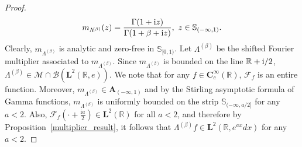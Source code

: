 \documentclass[12pt]{amsart}
\newcommand{\hptg}[2]{\hypertarget{#1}{#2}}
\numberwithin{equation}{section}
\newcommand{\bb}{\mathbb}
\newcommand{\hpt}[2]{#2}
\newcommand{\bmrm}[2][2]{\mathbf{#2}^{#1}}
\newcommand{\fou}{\mathcal{F}}
\newcommand{\C}{\mathbf{C}}
\newcommand{\A}{\mathbf{A}}
\newcommand{\LL}{\Lambda}
\renewcommand{\i}{\mathrm{i}}
\theoremstyle{definition}
\theoremstyle{assump}
\theoremstyle{remark}
\begin{document}
{\begin{proof}
\begin{align*}
m_{\Lambda^{\!(\beta)}}(z)=\frac{\Gamma(1+{\rm{i}}z   )}{\Gamma(1+\beta+{\rm{i}}z)}, \ z\in\bb{S}_{(-\infty,1)}.
\end{align*}
Clearly, $m_{\Lambda^{\!(\beta)}}$ is analytic and zero-free in $\bb{S}_{[0,1)}$. Let  $\Lambda^{\!(\beta)}$ be the shifted Fourier multiplier associated to $m_{\Lambda^{\!(\beta)}}$. Since $m_{\Lambda^{\!(\beta)}}$ is bounded on the line $\bb{R}+{\rm{i}}/2$, $\Lambda^{\!(\beta)}\in\mathscr{M}\cap\mathscr{B}(\bmrm{L}(\bb{R},e))$.  We note that for any $f\in \C^\infty_c(\bb{R})$, $\mathcal{F}_{f}$ is an entire function. Moreover, $m_{\LL^{\!(\beta)}}\in\A_{(-\infty,1)}$ and by the Stirling asymptotic formula of Gamma functions, $m_{\LL^{\!(\beta)}}$ is uniformly bounded on the \hpt{R24}{strip $\bb{S}_{(-\infty, a/2]}$ for any $a<2$}. \hptg{C39}{Also, $\fou_f(\cdot+\frac{\i a}{2})\in\bmrm{L}(\bb R)$ for all $a<2$, and therefore by Proposition~\ref{multiplier_result}, it follows that $\Lambda^{\!(\beta)}f\in\bmrm{L}(\bb{R},e^{ax}dx)$ for any $a<2$.}


\end{proof}}
\end{document}
